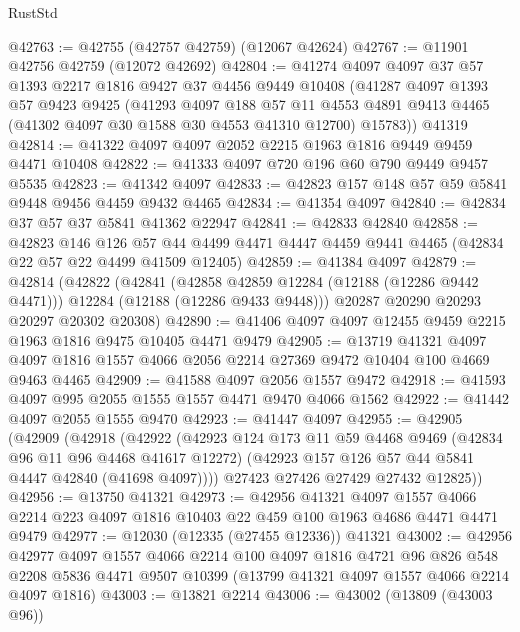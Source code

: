 \begin{lexlean}{RustStd}
\begin{coremodule}
@42763 := @42755 (@42757 @42759) (@12067 @42624)
@42767 := @11901 @42756 @42759 (@12072 @42692)
@42804 := @41274
    @4097
    @4097
    @37
    @57
    @1393
    @2217
    @1816
    @9427
    @37
    @4456
    @9449
    @10408
    (@41287
      @4097
      @1393
      @57
      @9423
      @9425
      (@41293
        @4097
        @188
        @57
        @11
        @4553
        @4891
        @9413
        @4465
        (@41302 @4097 @30 @1588 @30 @4553 @41310 @12700)
        @15783))
    @41319
@42814 := @41322 @4097 @4097 @2052 @2215 @1963 @1816 @9449 @9459 @4471 @10408
@42822 := @41333 @4097 @720 @196 @60 @790 @9449 @9457 @5535
@42823 := @41342 @4097
@42833 := @42823 @157 @148 @57 @59 @5841 @9448 @9456 @4459 @9432 @4465
@42834 := @41354 @4097
@42840 := @42834 @37 @57 @37 @5841 @41362 @22947
@42841 := @42833 @42840
@42858 := @42823
    @146
    @126
    @57
    @44
    @4499
    @4471
    @4447
    @4459
    @9441
    @4465
    (@42834 @22 @57 @22 @4499 @41509 @12405)
@42859 := @41384 @4097
@42879 := @42814
    (@42822
      (@42841
        (@42858 @42859 @12284 (@12188 (@12286 @9442 @4471)))
        @12284
        (@12188 (@12286 @9433 @9448)))
      @20287
      @20290
      @20293
      @20297
      @20302
      @20308)
@42890 := @41406 @4097 @4097 @12455 @9459 @2215 @1963 @1816 @9475 @10405 @4471 @9479
@42905 := @13719
    @41321
    @4097
    @4097
    @1816
    @1557
    @4066
    @2056
    @2214
    @27369
    @9472
    @10404
    @100
    @4669
    @9463
    @4465
@42909 := @41588 @4097 @2056 @1557 @9472
@42918 := @41593 @4097 @995 @2055 @1555 @1557 @4471 @9470 @4066 @1562
@42922 := @41442 @4097 @2055 @1555 @9470
@42923 := @41447 @4097
@42955 := @42905
    (@42909
      (@42918
        (@42922
          (@42923
            @124
            @173
            @11
            @59
            @4468
            @9469
            (@42834 @96 @11 @96 @4468 @41617 @12272)
            (@42923 @157 @126 @57 @44 @5841 @4447 @42840 (@41698 @4097))))
        @27423
        @27426
        @27429
        @27432
        @12825))
@42956 := @13750 @41321
@42973 := @42956
    @41321
    @4097
    @1557
    @4066
    @2214
    @223
    @4097
    @1816
    @10403
    @22
    @459
    @100
    @1963
    @4686
    @4471
    @4471
    @9479
@42977 := @12030 (@12335 (@27455 @12336)) @41321
@43002 := @42956
    @42977
    @4097
    @1557
    @4066
    @2214
    @100
    @4097
    @1816
    @4721
    @96
    @826
    @548
    @2208
    @5836
    @4471
    @9507
    @10399
    (@13799 @41321 @4097 @1557 @4066 @2214 @4097 @1816)
@43003 := @13821 @2214
@43006 := @43002 (@13809 (@43003 @96))

\end{coremodule}
\end{lexlean}
